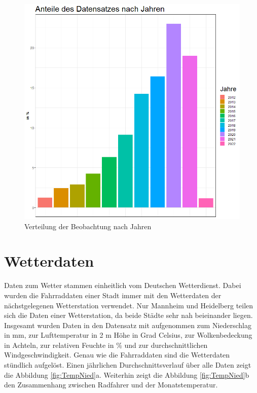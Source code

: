 \documentclass[a4paper,12pt]{thesis}
\begin{document}
\begin{figure}[!ht]
	\centering
	\includegraphics[width=\textwidth]{Plots/plot28.png}
	\caption{Verteilung der Beobachtung nach Jahren}
	\label{Jahre}
\end{figure}

\section{Wetterdaten}

Daten zum Wetter stammen einheitlich vom Deutschen Wetterdienst. Dabei wurden die Fahrraddaten einer Stadt immer mit den Wetterdaten der nächstgelegenen Wetterstation verwendet. Nur Mannheim und Heidelberg teilen sich die Daten einer Wetterstation, da beide Städte sehr nah beieinander liegen. Insgesamt wurden Daten in den Datensatz mit aufgenommen zum Niederschlag in mm, zur Lufttemperatur in 2 m Höhe in Grad Celsius, zur Wolkenbedeckung in Achteln, zur relativen Feuchte in \% und zur durchschnittlichen Windgeschwindigkeit. Genau wie die Fahrraddaten sind die Wetterdaten stündlich aufgelöst. Einen jährlichen Durchschnittsverlauf über alle Daten zeigt die Abbildung \ref{fig:TempNied}a. Weiterhin zeigt die Abbildung \ref{fig:TempNied}b den Zusammenhang zwischen Radfahrer und der Monatstemperatur.
\end{document}
